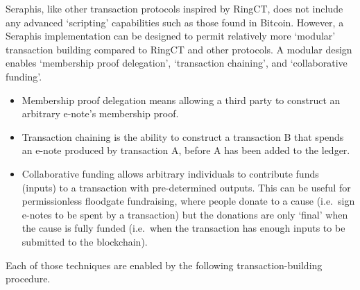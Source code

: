 Seraphis, like other transaction protocols inspired by RingCT, does not include any advanced `scripting' capabilities such as those found in Bitcoin. However, a Seraphis implementation can be designed to permit relatively more `modular' transaction building compared to RingCT and other protocols. A modular design enables `membership proof delegation', `transaction chaining', and `collaborative funding'.

\begin{itemize}
    \item Membership proof delegation means allowing a third party to construct an arbitrary e-note's membership proof.

    \item Transaction chaining is the ability to construct a transaction B that spends an e-note produced by transaction A, before A has been added to the ledger.

    \item Collaborative funding allows arbitrary individuals to contribute funds (inputs) to a transaction with pre-determined outputs. This can be useful for permissionless floodgate fundraising, where people donate to a cause (i.e.\ sign e-notes to be spent by a transaction) but the donations are only `final' when the cause is fully funded (i.e.\ when the transaction has enough inputs to be submitted to the blockchain).
\end{itemize}

Each of those techniques are enabled by the following transaction-building procedure.

